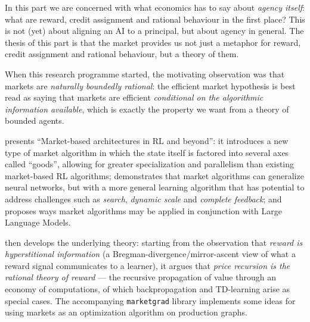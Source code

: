 
\begin{draftblock}
\noindent In this part we are concerned with what economics has to say about \emph{agency itself}: what are reward, credit assignment and rational behaviour in the first place? This is not (yet) about aligning an AI to a principal, but about agency in general. The thesis of this part is that the market provides us not just a metaphor for reward, credit assignment and rational behaviour, but a theory of them.
\end{draftblock}

When this research programme started, the motivating observation was that markets are \emph{naturally boundedly rational}: the efficient market hypothesis is best read as saying that markets are efficient \emph{conditional on the algorithmic information available}, which is exactly the property we want from a theory of bounded agents.

 presents ``Market-based architectures in RL and beyond'': it introduces a new type of market algorithm in which the state itself is factored into several axes called ``goods'', allowing for greater specialization and parallelism than existing market-based RL algorithms; demonstrates that market algorithms can generalize neural networks, but with a more general learning algorithm that has potential to address challenges such as \emph{search}, \emph{dynamic scale} and \emph{complete feedback}; and proposes ways market algorithms may be applied in conjunction with Large Language Models.

\begin{draftblock}
 then develops the underlying theory: starting from the observation that \emph{reward is hyperstitional information} (a Bregman-divergence/mirror-ascent view of what a reward signal communicates to a learner), it argues that \emph{price recursion is the rational theory of reward} --- the recursive propagation of value through an economy of computations, of which backpropagation and TD-learning arise as special cases. The accompanying \texttt{marketgrad} library implements some ideas for using markets as an optimization algorithm on production graphs.
\end{draftblock}
